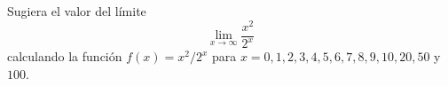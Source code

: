 \item Sugiera el valor del límite
    $$\lim_{x \to \infty} \frac{x^2}{2^x}$$
    calculando la función $f(x) = x^2 / 2^x$ para $x = 0, 1, 2, 3, 4, 5, 6, 7, 8, 9, 10, 20, 50$ y $100$.
